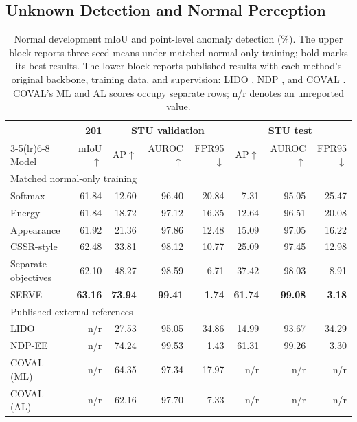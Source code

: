 \documentclass{article}
\begin{document}
\subsection{Unknown Detection and Normal Perception}
\begin{table}[t]
\caption{Normal development mIoU and point-level anomaly detection (\%). The upper block reports three-seed means under matched normal-only training; bold marks its best results. The lower block reports published results with each method's original backbone, training data, and supervision: LIDO \citep{lido}, NDP \citep{ndp}, and COVAL \citep{coval}. COVAL's ML and AL scores occupy separate rows; n/r denotes an unreported value.}
\label{tab:main}
\centering
\begin{tabular}{lrrrrrrr}
\toprule
 & 201 & \multicolumn{3}{c}{STU validation} & \multicolumn{3}{c}{STU test}\\
\cmidrule(lr){3-5}\cmidrule(lr){6-8}
Model & mIoU$\uparrow$ & AP$\uparrow$ & AUROC$\uparrow$ & FPR95$\downarrow$ & AP$\uparrow$ & AUROC$\uparrow$ & FPR95$\downarrow$\\
\midrule
\multicolumn{8}{l}{Matched normal-only training}\\
Softmax & 61.84 & 12.60 & 96.40 & 20.84 & 7.31 & 95.05 & 25.47\\
Energy & 61.84 & 18.72 & 97.12 & 16.35 & 12.64 & 96.51 & 20.08\\
Appearance & 61.92 & 21.36 & 97.86 & 12.48 & 15.09 & 97.05 & 16.22\\
CSSR-style & 62.48 & 33.81 & 98.12 & 10.77 & 25.09 & 97.45 & 12.98\\
Separate objectives & 62.10 & 48.27 & 98.59 & 6.71 & 37.42 & 98.03 & 8.91\\
SERVE & \textbf{63.16} & \textbf{73.94} & \textbf{99.41} & \textbf{1.74} & \textbf{61.74} & \textbf{99.08} & \textbf{3.18}\\
\midrule
\multicolumn{8}{l}{Published external references}\\
LIDO & n/r & 27.53 & 95.05 & 34.86 & 14.99 & 93.67 & 34.29\\
NDP-EE & n/r & 74.24 & 99.53 & 1.43 & 61.31 & 99.26 & 3.30\\
COVAL (ML) & n/r & 64.35 & 97.34 & 17.97 & n/r & n/r & n/r\\
COVAL (AL) & n/r & 62.16 & 97.70 & 7.33 & n/r & n/r & n/r\\
\bottomrule
\end{tabular}
\end{table}
\end{document}
